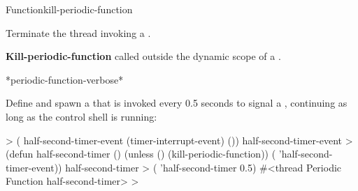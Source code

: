 
\begin{functiondoc}{Function}{kill-periodic-function}{\noargs{}}
%
%

\fnsyntax

\fnpurpose Terminate the thread invoking a .

\fnpackage {}

\fnmodule {}

\fnerrors
\nothreads{}

\textbf{Kill-periodic-function} called outside the dynamic scope of a
.

\begin{alsos}{*periodic-function-verbose*}
\end{alsos}

%
%
%
%
%
\fnexample Define and spawn a  that is invoked every
0.5 seconds to signal a , continuing
as long as the control shell is running:
%
\W\supp
\begin{example}
  > ( half-second-timer-event (timer-interrupt-event)
      ())
  half-second-timer-event
  > (defun half-second-timer ()
      (unless ()
        (kill-periodic-function))
      ( 'half-second-timer-event))
  half-second-timer
  > ( 'half-second-timer 0.5)
  #<thread Periodic Function half-second-timer>
  >
\end{example}

\end{functiondoc}


